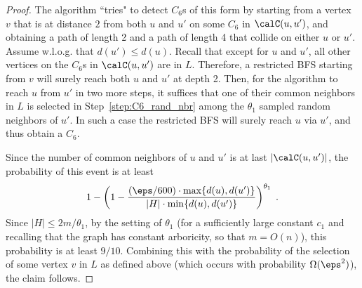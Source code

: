 \begin{proof}
The algorithm ``tries" to detect $C_6$s of this form by starting from a vertex $v$ that is at distance $2$ from both $u$ and $u'$ on some $C_6$ in $\calC(u,u')$, and 
obtaining a path of length 2 and a path of length 4 that collide on either $u$ or $u'$. Assume w.l.o.g. that $d(u')\leq d(u)$. 
Recall that except for $u$ and $u'$, all other vertices on the $C_6$s in $\calC(u,u')$ are in $L$. Therefore, a restricted BFS starting from $v$ will surely reach both $u$ and $u'$ at depth 2. Then, for the algorithm to reach $u$ from  $u'$ in two more steps, it suffices that one of their common neighbors in $L$ is selected in Step~\ref{step:C6_rand_nbr} among the $\theta_1$ sampled random neighbors of $u'$. In such a case the restricted BFS will surely reach $u$  via $u'$,   and thus obtain a $C_6$.

Since the number of common neighbors of $u$ and $u'$ is at last $|\calC(u,u')|$,
the probability of this event is at least 
$$1-\left(1-\frac{(\eps/600)\cdot \max\{d(u),d(u')\}}{|H|\cdot \min\{d(u),d(u')\}}\right)^{\theta_1}\;.$$
Since $|H| \leq 2m/\theta_1$, by the setting of $\theta_1$ (for a sufficiently large constant $c_1$ and recalling that the graph has constant arboricity, so that $m=O(n)$), this probability is at least $9/10$. Combining this with the probability of the selection of some vertex $v$ in $L$ as defined above (which occurs with probability $\Omega(\eps^2)$), the claim follows. 

\end{proof}

